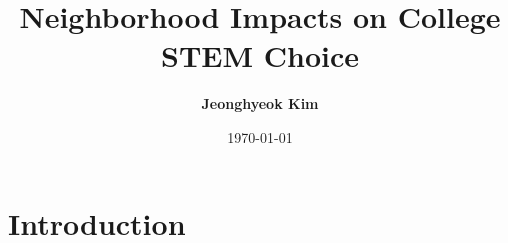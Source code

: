 \documentclass[aspectratio=169,xcolor=dvipsnames]{beamer}
\title[Background and Literature]{Neighborhood Impacts on College STEM Choice}
\author{\textbf{Jeonghyeok Kim}}
\institute{University of Houston}
\date{\today}
\newenvironment{wideitemize}{\itemize\addtolength{\itemsep}{10pt}}{\enditemize}
\begin{document}
\begin{frame}
  \titlepage
\end{frame}



\section{Introduction}\label{intro}

  
  

\end{document}
